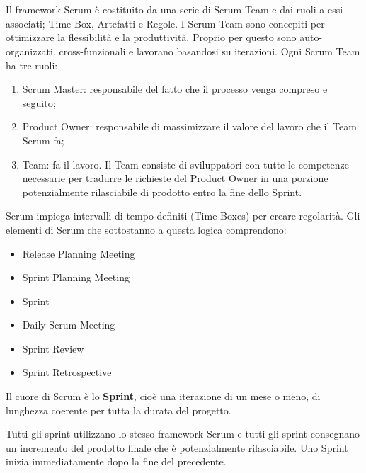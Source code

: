 \section*{\color{Blue}{LA SOSTANZA DI SCRUM}}
Il framework Scrum  \`e costituito da una serie  di
Scrum Team e dai ruoli a essi associati; Time-Box, Artefatti e Regole.
I  Scrum Team sono concepiti per   ottimizzare la  flessibilit\`a e  la produttivit\`a. Proprio per questo
sono auto-organizzati, cross-funzionali e lavorano basandosi su iterazioni.
Ogni Scrum Team ha tre ruoli: 

\begin{enumerate}
\item Scrum Master: responsabile del fatto che il processo venga compreso e seguito;
\item Product Owner: responsabile di massimizzare il valore
del lavoro  che il  Team Scrum  fa; 
\item Team: fa  il lavoro. Il Team consiste di
sviluppatori con  tutte le  competenze necessarie  per tradurre le richieste  del
Product Owner in  una
porzione potenzialmente rilasciabile di prodotto entro  la fine  dello Sprint.

\end{enumerate}

Scrum impiega intervalli  di tempo definiti (Time-Boxes) per creare regolarit\`a.  Gli elementi di Scrum che sottostanno a questa logica comprendono:
\begin{itemize}
\item Release  Planning  Meeting 
\item Sprint Planning  Meeting
\item Sprint
\item Daily Scrum Meeting
\item Sprint Review
\item Sprint Retrospective
\end{itemize}

Il cuore di Scrum \`e lo \textbf{Sprint}, cio\`e una iterazione di un mese o meno, di lunghezza coerente per
tutta la durata del progetto.

Tutti gli sprint utilizzano  lo stesso framework Scrum  e tutti
gli sprint  consegnano un  incremento del  prodotto finale  che \`e potenzialmente
rilasciabile.  Uno  Sprint inizia  immediatamente  dopo la fine del precedente.


